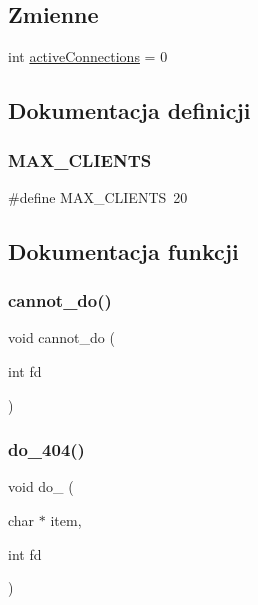 \subsection*{Zmienne}
\begin{DoxyCompactItemize}
\item 
int \mbox{\hyperlink{10d-serwer_8c_a1f5bcbe2b6bbbf057f1e857d6466ac34}{active\+Connections}} = 0
\end{DoxyCompactItemize}


\subsection{Dokumentacja definicji}
\mbox{\label{10d-serwer_8c_a0a8f91f93d75a07f0ae45077db45b3eb}} 
\subsubsection{\texorpdfstring{MAX\_CLIENTS}{MAX\_CLIENTS}}
{\footnotesize\ttfamily \#define M\+A\+X\+\_\+\+C\+L\+I\+E\+N\+TS~20}



\subsection{Dokumentacja funkcji}
\mbox{\label{10d-serwer_8c_a8e603d6f76a35b616135eb394f6ec080}} 
\subsubsection{\texorpdfstring{cannot\_do()}{cannot\_do()}}
{\footnotesize\ttfamily void cannot\+\_\+do (\begin{DoxyParamCaption}\item[{int}]{fd }\end{DoxyParamCaption})}

\mbox{\label{10d-serwer_8c_ad3f91122750391e238cfbee3b88975ec}} 
\subsubsection{\texorpdfstring{do\_404()}{do\_404()}}
{\footnotesize\ttfamily void do\+\_ (\begin{DoxyParamCaption}\item[{char $\ast$}]{item,  }\item[{int}]{fd }\end{DoxyParamCaption})}

